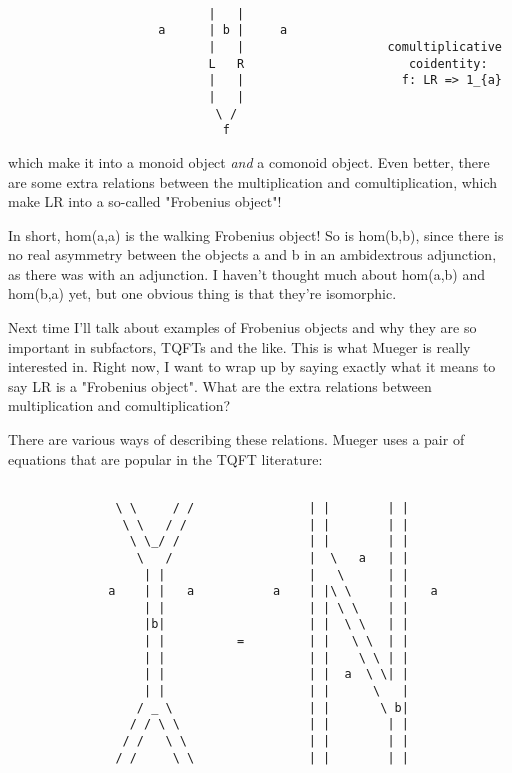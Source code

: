 \begin{verbatim}

                            |   |    
                     a      | b |     a 
                            |   |                    comultiplicative
                            L   R                       coidentity:
                            |   |                      f: LR => 1_{a}
                            |   |
                             \ /
                              f
\end{verbatim}
    
which make it into a monoid object \emph{and} a comonoid object.  Even
better, there are some extra relations between the multiplication and
comultiplication, which make LR into a so-called "Frobenius object"!

In short, hom(a,a) is the walking Frobenius object!  So is hom(b,b),
since there is no real asymmetry between the objects a and b in an
ambidextrous adjunction, as there was with an adjunction.  I haven't
thought much about hom(a,b) and hom(b,a) yet, but one obvious thing is
that they're isomorphic.


Next time I'll talk about examples of Frobenius objects and why they are
so important in subfactors, TQFTs and the like.  This is what Mueger is
really interested in.  Right now, I want to wrap up by saying exactly
what it means to say LR is a "Frobenius object".  What are the
extra relations between multiplication and comultiplication?

There are various ways of describing these relations.   Mueger uses
a pair of equations that are popular in the TQFT literature:

                                      

\begin{verbatim}

               \ \     / /                | |        | |
                \ \   / /                 | |        | |
                 \ \_/ /                  | |        | |
                  \   /                   |  \   a   | |
                   | |                    |   \      | |
              a    | |   a           a    | |\ \     | |   a
                   | |                    | | \ \    | |
                   |b|                    | |  \ \   | |
                   | |          =         | |   \ \  | |
                   | |                    | |    \ \ | |
                   | |                    | |  a  \ \| |
                   | |                    | |      \   |
                  / _ \                   | |       \ b|
                 / / \ \                  | |        | |
                / /   \ \                 | |        | | 
               / /     \ \                | |        | |
\end{verbatim}
    
